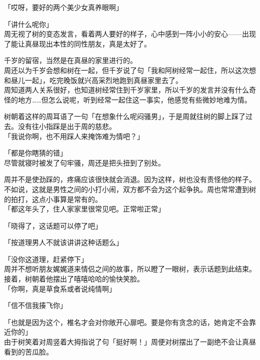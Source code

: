 「哎呀，要好的两个美少女真养眼啊」

「讲什么呢你」\\

周无视了树的变态发言，看着两人要好的样子，心中感到一阵小小的安心——出现了能让真昼现出本性的同性朋友，真是太好了。\\

\vspace{2\baselineskip}

千岁的留宿，当然是在真昼的家里进行的。\\

周还以为千岁会想和树在一起，但千岁说了句「我和阿树经常一起住，所以这次想和昼儿一起」，吃完晚饭就兴高采烈地跑到真昼家里去了。\\

周知道两人关系很好，也知道树经常住到千岁家里，所以千岁的发言并没有什么奇怪的地方……但怎么说呢，听到经常一起住这一事实，他感觉有些微妙地难为情。

树朝着这样的周耳语了一句「在想象什么呢闷骚男」，于是周就往树的脚上踩了过去。没有往小指踩是出于周的慈悲。\\

「我说你啊，也不用踩人来掩饰难为情吧？」

「都是你瞎猜的错」\\

尽管就寝时被发了句牢骚，周还是把头扭到了别处。

周并不是使劲踩的，疼痛应该很快就会消退。因为这样，树也没有责怪他的样子。不如说，这就是男性之间的小打小闹，双方都不会为这个起争执。周也常常遭到树的拍打，这点小事算是常有的。\\

「都这年头了，住人家家里很常见吧。正常啦正常」

「晓得了，这话题可以停了吧」

「按道理男人不就该讲讲这种话题么」

「没你这道理，赶紧停下」\\

周并不想听朋友娓娓道来情侣之间的故事，所以瞪了一眼树，表示话题到此结束。接着，树朝着他摆出了嘻嘻哈哈的愉快笑脸。\\

「你啊，真是草食系或者说纯情啊」

「信不信我揍飞你」

「也就是因为这个，椎名才会对你敞开心扉吧。要是你有贪念的话，她肯定不会靠近你的」\\

由于树笑着对周竖着大拇指说了句「挺好啊！」周便对树摆出了一副绝不会让真昼看到的苦瓜脸。

